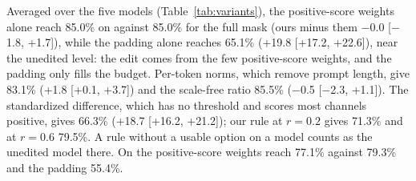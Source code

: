 Averaged over the five models (Table~\ref{tab:variants}), the positive-score weights alone reach 85.0\% on \LB{} against 85.0\% for the full mask (ours minus them $-$0.0 [$-$1.8, +1.7]), while the padding alone reaches 65.1\% (+19.8 [+17.2, +22.6]), near the unedited level: the edit comes from the few positive-score weights, and the padding only fills the budget. Per-token norms, which remove prompt length, give 83.1\% (+1.8 [+0.1, +3.7]) and the scale-free ratio 85.5\% ($-$0.5 [$-$2.3, +1.1]). The standardized difference, which has no threshold and scores most channels positive, gives 66.3\% (+18.7 [+16.2, +21.2]); our rule at $r=0.2$ gives 71.3\% and at $r=0.6$ 79.5\%. A rule without a usable option on a model counts as the unedited model there. On \AIL{} the positive-score weights reach 77.1\% against 79.3\% and the padding 55.4\%.